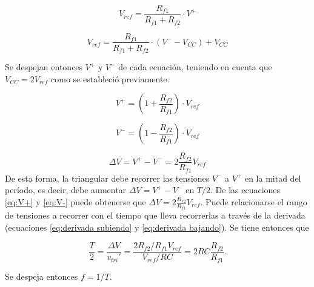 \begin{minipage}{0.45\textwidth}
    \centering
    \begin{equation*}
        V_{ref} = \frac{R_{f1}}{R_{f1} + R_{f2}} \cdot V^+
    \end{equation*}
\end{minipage}
\hfill
\begin{minipage}{0.45\textwidth}
    \centering
    \begin{equation*}
        V_{ref} = \frac{R_{f1}}{R_{f1} + R_{f2}} \cdot (V^- - V_{CC}) + V_{CC}
    \end{equation*}
\end{minipage}

Se despejan entonces $V^+$ y $V^-$ de cada ecuación, teniendo en cuenta que $V_{CC} = 2V_{ref}$ como se estableció previamente.

\begin{minipage}{0.45\textwidth}
    \centering
    \begin{equation}
        V^+ = (1 + \frac{R_{f2}}{R_{f1}}) \cdot V_{ref}
        \label{eq:V+}
    \end{equation}
\end{minipage}
\hfill
\begin{minipage}{0.45\textwidth}
    \centering
    \begin{equation}
        V^- = (1 - \frac{R_{f2}}{R_{f1}}) \cdot V_{ref}
        \label{eq:V-}
    \end{equation}
\end{minipage}


\begin{equation}
    \Delta V = V^+ - V^- = 2 \frac{R_{f2}}{R_{f1}} V_{ref}
    \label{eq:delta V}
\end{equation}
De esta forma, la triangular debe recorrer las tensiones $V^-$ a $V^+$ en la mitad del período, es decir, debe aumentar $\Delta V = V^+ - V^-$ en $T/2$. De las ecuaciones \ref{eq:V+} y \ref{eq:V-} puede obtenerse que $\Delta V = 2 \frac{R_{f2}}{R_{f1}} V_{ref}$. Puede relacionarse el rango de tensiones a recorrer con el tiempo que lleva recorrerlas a través de la derivada (ecuaciones \ref{eq:derivada subiendo} y \ref{eq:derivada bajando}). Se tiene entonces que

\begin{equation*}
    \frac{T}{2} = \frac{\Delta V}{v_{tri}'} = \frac{2 R_{f2}/R_{f1} V_{ref}}{V_{ref}/RC} = 2 RC \frac{R_{f2}}{R_{f1}}. 
\end{equation*}


Se despeja entonces $f = 1/T$.

